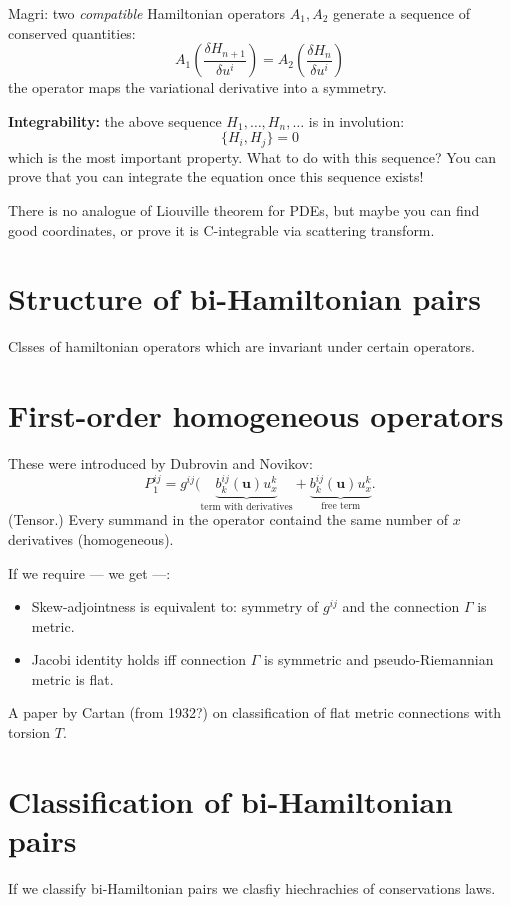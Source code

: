 Magri: two  \textit{compatible } Hamiltonian operators $A_1,A_2$ generate a sequence of conserved quantities:
\[A_1\left( \frac{\delta H_{n+1}}{\delta u^i} \right) =A_2\left( \frac{\delta H_n}{\delta u^i} \right) \]
the operator maps the variational derivative into a symmetry.

\textbf{Integrability:} the above sequence $H_1,\ldots,H_n,\ldots$ is in involution:
\[\{H_i,H_j\}=0\]
which is the {\color{3}most important property}. What to do with this sequence? You can prove that you can integrate the equation once this sequence exists!

There is no analogue of Liouville theorem for PDEs, but maybe you can find good coordinates, or prove it is C-integrable via scattering transform.

\section{Structure of bi-Hamiltonian pairs}

Clsses of hamiltonian operators which are invariant under certain operators.

\section{First-order homogeneous operators}

These were introduced by Dubrovin and Novikov:
\[P^{ij}_1=g^{ij}(\underbrace{b^{ij}_k(\mathbf{u})u^k_x}_{\text{term with derivatives} }+\underbrace{b^{ij}_k(\mathbf{u})u^k_x}_{\text{free term} }.\]
(Tensor.) Every summand in the operator containd the same number of $x$ derivatives (homogeneous).

If we require --- we get ---:
\begin{itemize}
\item Skew-adjointness is equivalent to: symmetry of $g^{ij}$ and the connection $\Gamma$ is metric.
\item Jacobi identity holds iff connection $\Gamma$ is symmetric and pseudo-Riemannian metric is flat.
\end{itemize}

\begin{remark}\leavevmode
	A paper by Cartan (from 1932?) on classification of flat metric connections with torsion $T$.
\end{remark}

\section{Classification of bi-Hamiltonian pairs}
If we classify bi-Hamiltonian pairs we clasfiy hiechrachies of conservations laws.

